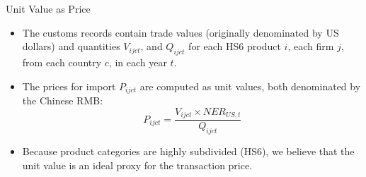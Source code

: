 \documentclass[10pt]{beamer}
\begin{document}
\begin{frame}{Unit Value as Price}
	\begin{itemize}
		\item The customs records contain trade values (originally denominated by US dollars) and quantities $V_{ijct}$, and $Q_{ijct}$ for each HS6 product $i$, each firm $j$, from each country $c$, in each year $t$.
		\item The prices for import $P_{i j c t}$ are computed as unit values, both denominated by the Chinese RMB:
		$$
		P_{ijct}=\frac{V_{ijct} \times NER_{US,t}}{Q_{ijct}}
		$$
		\item Because product categories are highly subdivided (HS6), we believe that the unit value is an ideal proxy for the transaction price.
	\end{itemize}
\end{frame}
\end{document}
